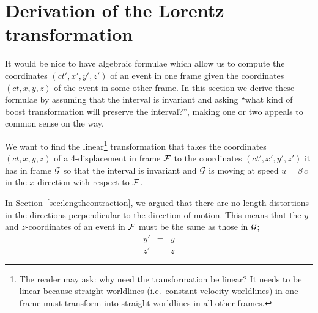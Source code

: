 \section{Derivation of the Lorentz transformation}
\label{sec:derive}

It would be nice to have algebraic formulae which allow us to compute
the coordinates $(ct',x',y',z')$ of an event in one frame given the
coordinates $(ct,x,y,z)$ of the event in some other frame.  In this
section we derive these formulae by assuming that the interval is
invariant and asking ``what kind of boost transformation will preserve
the interval?'', making one or two appeals to common sense on the way.

We want to find the linear\footnote{The reader may ask: why need the
transformation be linear?  It needs to be linear because straight
worldlines (i.e.\ constant-velocity worldlines) in one frame must
transform into straight worldlines in all other frames.}
transformation that takes the coordinates $(ct,x,y,z)$ of a
4-displacement in frame $\cal F$ to the coordinates $(ct',x',y',z')$
it has in frame $\cal G$ so that the interval is invariant and
$\cal G$ is moving at speed $u=\beta\, c$ in the $x$-direction with
respect to $\cal F$.

In Section~\ref{sec:lengthcontraction}, we argued that there are no
length distortions in the directions perpendicular to the direction of
motion.  This means that the $y$- and $z$-coordinates of an event in
$\cal F$ must be the same as those in $\cal G$;
\begin{eqnarray}
y' & = & y \nonumber\\
z' & = & z
\end{eqnarray}

